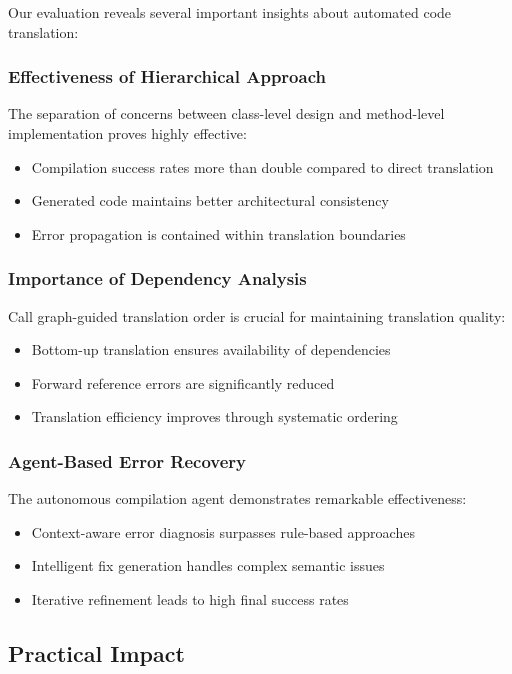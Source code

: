 Our evaluation reveals several important insights about automated code translation:

\subsubsection{Effectiveness of Hierarchical Approach}
The separation of concerns between class-level design and method-level implementation proves highly effective:
\begin{itemize}
\item Compilation success rates more than double compared to direct translation
\item Generated code maintains better architectural consistency
\item Error propagation is contained within translation boundaries
\end{itemize}

\subsubsection{Importance of Dependency Analysis}
Call graph-guided translation order is crucial for maintaining translation quality:
\begin{itemize}
\item Bottom-up translation ensures availability of dependencies
\item Forward reference errors are significantly reduced
\item Translation efficiency improves through systematic ordering
\end{itemize}

\subsubsection{Agent-Based Error Recovery}
The autonomous compilation agent demonstrates remarkable effectiveness:
\begin{itemize}
\item Context-aware error diagnosis surpasses rule-based approaches
\item Intelligent fix generation handles complex semantic issues
\item Iterative refinement leads to high final success rates
\end{itemize}

\subsection{Practical Impact}

